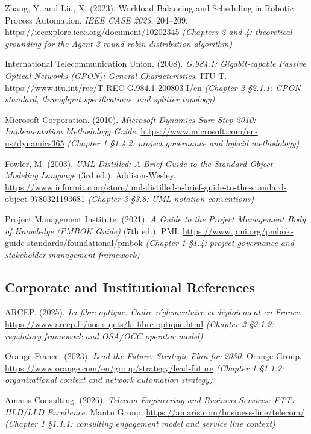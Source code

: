 Zhang, Y. and Liu, X. (2023). Workload Balancing and Scheduling in Robotic Process Automation. \textit{IEEE CASE 2023}, 204--209. \url{https://ieeexplore.ieee.org/document/10202345} \textit{(Chapters 2 and 4: theoretical grounding for the Agent 3 round-robin distribution algorithm)}

International Telecommunication Union. (2008). \textit{G.984.1: Gigabit-capable Passive Optical Networks (GPON): General Characteristics}. ITU-T. \url{https://www.itu.int/rec/T-REC-G.984.1-200803-I/en} \textit{(Chapter 2 \S{}2.1.1: GPON standard, throughput specifications, and splitter topology)}

Microsoft Corporation. (2010). \textit{Microsoft Dynamics Sure Step 2010: Implementation Methodology Guide}. \url{https://www.microsoft.com/en-us/dynamics365} \textit{(Chapter 1 \S{}1.4.2: project governance and hybrid methodology)}

Fowler, M. (2003). \textit{UML Distilled: A Brief Guide to the Standard Object Modeling Language} (3rd ed.). Addison-Wesley. \url{https://www.informit.com/store/uml-distilled-a-brief-guide-to-the-standard-object-9780321193681} \textit{(Chapter 3 \S{}3.8: UML notation conventions)}

Project Management Institute. (2021). \textit{A Guide to the Project Management Body of Knowledge (PMBOK Guide)} (7th ed.). PMI. \url{https://www.pmi.org/pmbok-guide-standards/foundational/pmbok} \textit{(Chapter 1 \S{}1.4: project governance and stakeholder management framework)}

\bigskip

\subsection*{Corporate and Institutional References}

ARCEP. (2025). \textit{La fibre optique: Cadre réglementaire et déploiement en France}. \url{https://www.arcep.fr/nos-sujets/la-fibre-optique.html} \textit{(Chapter 2 \S{}2.1.2: regulatory framework and OSA/OCC operator model)}

Orange France. (2023). \textit{Lead the Future: Strategic Plan for 2030}. Orange Group. \url{https://www.orange.com/en/group/strategy/lead-future} \textit{(Chapter 1 \S{}1.1.2: organizational context and network automation strategy)}

Amaris Consulting. (2026). \textit{Telecom Engineering and Business Services: FTTx HLD/LLD Excellence}. Mantu Group. \url{https://amaris.com/business-line/telecom/} \textit{(Chapter 1 \S{}1.1.1: consulting engagement model and service line context)}

